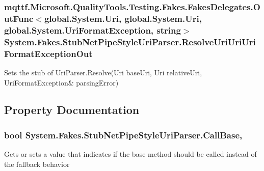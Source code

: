 \hypertarget{class_system_1_1_fakes_1_1_stub_net_pipe_style_uri_parser_a063bed632d692ca976174690f92c2321}{
\subsubsection[{Resolve\-Uri\-Uri\-Uri\-Format\-Exception\-Out}]{\setlength{\rightskip}{0pt plus 5cm}mqttf.\-Microsoft.\-Quality\-Tools.\-Testing.\-Fakes.\-Fakes\-Delegates.\-Out\-Func$<$global.\-System.\-Uri, global.\-System.\-Uri, global.\-System.\-Uri\-Format\-Exception, string$>$ System.\-Fakes.\-Stub\-Net\-Pipe\-Style\-Uri\-Parser.\-Resolve\-Uri\-Uri\-Uri\-Format\-Exception\-Out}}\label{class_system_1_1_fakes_1_1_stub_net_pipe_style_uri_parser_a063bed632d692ca976174690f92c2321}


Sets the stub of Uri\-Parser.\-Resolve(Uri base\-Uri, Uri relative\-Uri, Uri\-Format\-Exception\& parsing\-Error)



\subsection{Property Documentation}
\hypertarget{class_system_1_1_fakes_1_1_stub_net_pipe_style_uri_parser_a8f4d47c713105303f7d8f5be8b113a8f}{
\subsubsection[{Call\-Base}]{\setlength{\rightskip}{0pt plus 5cm}bool System.\-Fakes.\-Stub\-Net\-Pipe\-Style\-Uri\-Parser.\-Call\-Base\hspace{0.3cm}{\ttfamily [get]}, {\ttfamily [set]}}}\label{class_system_1_1_fakes_1_1_stub_net_pipe_style_uri_parser_a8f4d47c713105303f7d8f5be8b113a8f}


Gets or sets a value that indicates if the base method should be called instead of the fallback behavior

